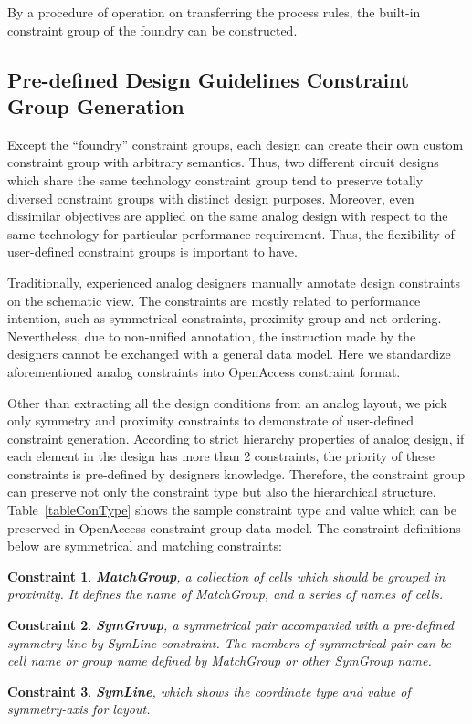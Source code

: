       By a procedure of operation on transferring the process rules, the built-in constraint group of the foundry can be constructed.

    \subsection{Pre-defined Design Guidelines Constraint Group Generation}\label{sec:PreDesignCG}
      
      Except the ``foundry'' constraint groups, each design can create their own custom constraint group with arbitrary semantics. Thus, two different circuit designs which share the same technology constraint group tend to preserve totally diversed constraint groups with distinct design purposes. Moreover, even dissimilar objectives are applied on the same analog design with respect to the same technology for particular performance requirement. Thus, the flexibility of user-defined constraint groups is important to have. 

      Traditionally, experienced analog designers manually annotate design constraints on the schematic view. The constraints are mostly related to performance intention, such as symmetrical constraints, proximity group and net ordering. Nevertheless, due to non-unified annotation, the instruction made by the designers cannot be exchanged with a general data model. Here we standardize aforementioned analog constraints into OpenAccess constraint format. 
    
      Other than extracting all the design conditions from an analog layout, we pick only symmetry and proximity constraints to demonstrate of user-defined constraint generation. According to strict hierarchy properties of analog design, if each element in the design has more than 2 constraints, the priority of these constraints is pre-defined by designers knowledge. Therefore, the constraint group can preserve not only the constraint type but also the hierarchical structure. Table~\ref{tableConType} shows the sample constraint type and value which can be preserved in OpenAccess constraint group data model. The constraint definitions below are symmetrical and matching constraints: 


      \newtheorem{Cons}{Constraint}
      \begin{Cons}
        {\bf MatchGroup}, a collection of cells which should be grouped in proximity. It defines the name of MatchGroup, and a series of names of cells.
      \end{Cons}
      \begin{Cons}
        {\bf SymGroup}, a symmetrical pair accompanied with a pre-defined symmetry line by SymLine constraint. The members of symmetrical pair can be cell name or group name defined by MatchGroup or other SymGroup name.
      \end{Cons}
      \begin{Cons}
        {\bf SymLine}, which shows the coordinate type and value of symmetry-axis for layout.
      \end{Cons}
    
